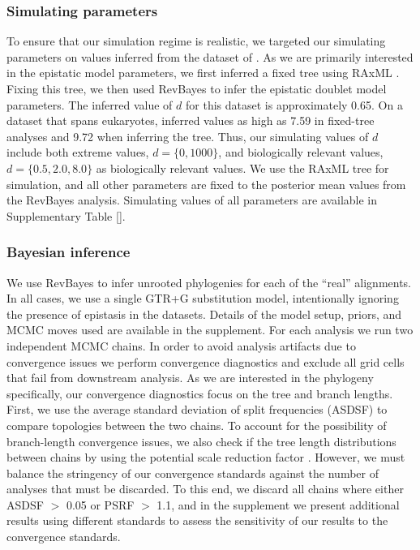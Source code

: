 \documentclass[11pt]{article}
\begin{document}
\subsubsection*{Simulating parameters\label{sec:tunicates}}
To ensure that our simulation regime is realistic, we targeted our simulating parameters on values inferred from the dataset of \cite{tsagkogeorga2009updated}.
As we are primarily interested in the epistatic model parameters, we first inferred a fixed tree using RAxML \citep{stamatakis2014raxml}.
Fixing this tree, we then used RevBayes \cite{hohna2016revbayes} to infer the epistatic doublet model parameters.
The inferred value of $d$ for this dataset is approximately 0.65.
On a dataset that spans eukaryotes, \citet{nasrallah2013phylogenetic} inferred values as high as 7.59 in fixed-tree analyses and 9.72 when inferring the tree.
Thus, our simulating values of $d$ include both extreme values, $d=\{0,1000\}$, and biologically relevant values, $d = \{0.5,2.0,8.0\}$ as biologically relevant values.
We use the RAxML tree for simulation, and all other parameters are fixed to the posterior mean values from the RevBayes analysis.
Simulating values of all parameters are available in Supplementary Table \ref{}.

\subsubsection*{Bayesian inference\label{sec:mcmc}}
We use RevBayes \citep{hohna2016revbayes} to infer unrooted phylogenies for each of the ``real'' alignments.
In all cases, we use a single GTR+G substitution model, intentionally ignoring the presence of epistasis in the datasets.
Details of the model setup, priors, and MCMC moves used are available in the supplement.
For each analysis we run two independent MCMC chains.
In order to avoid analysis artifacts due to convergence issues we perform convergence diagnostics and exclude all grid cells that fail from downstream analysis.
As we are interested in the phylogeny specifically, our convergence diagnostics focus on the tree and branch lengths.
First, we use the average standard deviation of split frequencies (ASDSF) to compare topologies between the two chains.
To account for the possibility of branch-length convergence issues, we also check if the tree length distributions between chains by using the potential scale reduction factor \citep[PSRF,\ ][]{brooks1998general}.
However, we must balance the stringency of our convergence standards against the number of analyses that must be discarded.
To this end, we discard all chains where either ASDSF $>$ 0.05 or PSRF $>$ 1.1, and in the supplement we present additional results using different standards to assess the sensitivity of our results to the convergence standards.
\end{document}
